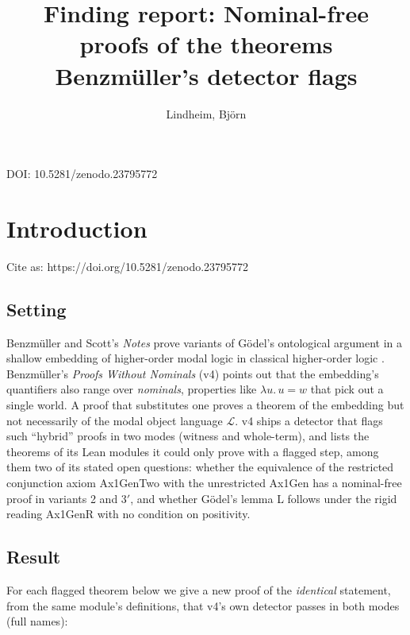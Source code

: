 \documentclass{article}
\title{Finding report: Nominal-free proofs of the theorems Benzmüller's detector flags}
\author{Lindheim, Björn}
\date{}
\begin{document}
\maketitle
\begin{center}DOI: 10.5281/zenodo.23795772\end{center}
\section{Introduction}
\label{sec:ontological-nominal-free-proofs}

Cite as: https://doi.org/10.5281/zenodo.23795772

\subsection*{Setting}

Benzmüller and Scott's \emph{Notes} prove variants of Gödel's ontological argument in a shallow
embedding of higher-order modal logic in classical higher-order logic \cite{benzmueller2025notes}.
Benzmüller's \emph{Proofs Without Nominals} \cite{benzmueller2026nominals} (v4) points out that the
embedding's quantifiers also range over \emph{nominals}, properties like $\lambda u.\,u = w$ that pick
out a single world. A proof that substitutes one proves a theorem of the embedding but not
necessarily of the modal object language $\mathcal L$. v4 ships a detector that flags such
``hybrid'' proofs in two modes (witness and whole-term), and lists the theorems of its Lean
modules it could only prove with a flagged step, among them two of its stated open questions:
whether the equivalence of the restricted conjunction axiom Ax1GenTwo with the unrestricted
Ax1Gen has a nominal-free proof in variants 2 and 3$'$, and whether Gödel's lemma L follows under
the rigid reading Ax1GenR with no condition on positivity.

\subsection*{Result}

For each flagged theorem below we give a new proof of the \emph{identical} statement, from the same
module's definitions, that v4's own detector passes in both modes (full names):
\end{document}
